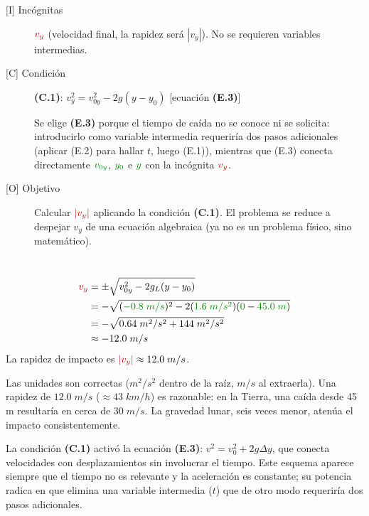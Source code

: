 \documentclass[11pt]{book}
\newcommand{\dato}[1]{\textcolor{colDatos}{#1}}
\newcommand{\incog}[1]{\textcolor{colIncog}{#1}}
\newcommand{\cond}[1]{\textcolor{colCond}{#1}}
\begin{document}
\begin{enumerate}
\begin{description}
\begin{description}
    \item[{[I]} Incógnitas] $\incog{v_y}$ (velocidad final, la rapidez será $|v_y|$). No se requieren variables intermedias.

    \item[{[C]} Condición] \textbf{(C.1)}: \cond{$v_y^2 = v_{0y}^2 - 2g(y - y_0)$} \hfill [ecuación \textbf{(E.3)}]

    Se elige \textbf{(E.3)} porque el tiempo de caída no se conoce ni se solicita: introducirlo como variable intermedia requeriría dos pasos adicionales (aplicar (E.2) para hallar $t$, luego (E.1)), mientras que (E.3) conecta directamente $\dato{v_{0y}}$, $\dato{y_0}$ e $\dato{y}$ con la incógnita $\incog{v_y}$.

    \item[{[O]} Objetivo] Calcular $\incog{|v_y|}$ aplicando la condición \textbf{(C.1)}. El problema se reduce a despejar $v_y$ de una ecuación algebraica (ya no es un problema físico, sino matemático).
\end{description}

\item[Ejecutar]~
\begin{align}
\incog{v_y} &= \pm\sqrt{v_{0y}^2 - 2g_L(y - y_0)} \nonumber\\
&= -\sqrt{(\dato{-0.8\;m/s})^2 - 2(\dato{1.6\;m/s^2})(\dato{0} - \dato{45.0\;m})} \nonumber\\
&= -\sqrt{0.64\;m^2/s^2 + 144\;m^2/s^2} \nonumber\\
&\approx -12.0\;m/s
\end{align}
La rapidez de impacto es $\incog{|v_y|} \approx 12.0\;m/s$.

\item[Revisar] Las unidades son correctas ($m^2/s^2$ dentro de la raíz, $m/s$ al extraerla). Una rapidez de $12.0\;m/s$ ($\approx 43\;km/h$) es razonable: en la Tierra, una caída desde 45 m resultaría en cerca de $30\;m/s$. La gravedad lunar, seis veces menor, atenúa el impacto consistentemente.

\item[Generalizar] La condición \textbf{(C.1)} activó la ecuación \textbf{(E.3)}: $v^2 = v_0^2 + 2g\Delta y$, que conecta velocidades con desplazamientos sin involucrar el tiempo. Este esquema aparece siempre que el tiempo no es relevante y la aceleración es constante; su potencia radica en que elimina una variable intermedia ($t$) que de otro modo requeriría dos pasos adicionales.


\end{description}
\end{enumerate}
\end{document}
